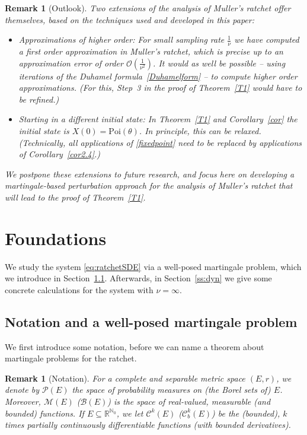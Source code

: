 \documentclass{imsart}
\theoremstyle{plain}
\newtheorem{remark}[theorem]{Remark}
\theoremstyle{definition}
\begin{document}
\begin{remark}[Outlook]
Two extensions of  the analysis of Muller's ratchet offer themselves, based on the techniques  used and developed in this paper:
\begin{itemize}
   \item Approximations of higher order: For small sampling rate $\tfrac 1 \nu$ we have computed a first order approximation in Muller's ratchet, which is precise up to an approximation error of order $\mathcal O(\tfrac 1 {\nu^2})$.  It would as well be possible -- using iterations of the Duhamel formula~\eqref{Duhamelform} -- to compute higher order approximations. (For this, Step~3 in the proof of Theorem~\ref{T1} would have to be refined.) 
   \item Starting in a different initial state: In Theorem~\ref{T1} and Corollary~\ref{cor} the initial state is $X(0)=\text{Poi}(\theta)$. In principle, this can be relaxed. (Technically, all applications of \eqref{fixedpoint} need to be replaced by applications of Corollary~\ref{cor2.4}.)
\end{itemize}
We postpone these extensions to future research, and focus here on developing a martingale-based perturbation approach for the analysis of Muller's ratchet that will lead to the proof of Theorem~\ref{T1}.
\end{remark}

\section{Foundations}
\label{S:mart}
We study the system \eqref{eq:ratchetSDE} via a well-posed martingale problem, which we introduce in Section~\ref{ss:mp}. Afterwards, in Section~\ref{ss:dyn} we give some concrete calculations for the system with $\nu=\infty$. 
\subsection{Notation and a well-posed martingale problem}
\label{ss:mp}
We first introduce some notation, before we can name a theorem about martingale problems for the ratchet. 

\begin{remark}[Notation]
  For a complete and separable metric space $(E,r)$, we denote by $\mathcal P(E)$ the space of probability measures on (the Borel sets of) $E$. Moreover, $\mathcal M(E)$ ($\mathcal B(E)$) is the space of real-valued, measurable (and bounded) functions. If $E\subseteq \mathbb R^{\mathbb N_0}$, we let $\mathcal C^k(E)$ ($\mathcal C_b^k(E)$) be the (bounded), $k$ times partially continuously differentiable functions (with bounded derivatives). 
\end{remark}
\end{document}
